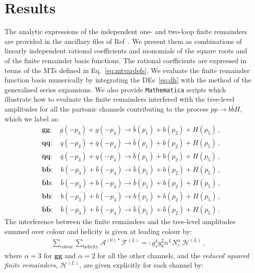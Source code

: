 \documentclass[main.tex]{subfiles}
\begin{document}
\section{Results}
\label{Hbbsec:results}
The analytic expressions of the independent one- and two-loop finite remainders are provided in the ancillary files of Ref~\cite{Badger:2021ega}. We present them as combinations of linearly independent rational coefficients and monomials of the square roots and of the finite remainder basis functions. The rational coefficients are expressed in terms of the MTs defined in Eq.~\ref{eq:mtvardefs}. We evaluate the finite remainder function basis numerically by integrating the DEs~\ref{eq:dh} with the method of the generalised series expansions. We also provide \texttt{Mathematica} scripts which illustrate how to evaluate the finite remainders interfered with the tree-level amplitudes for all the partonic channels contributing to the process $pp\to b\bar{b} H$, which we label as:
\begin{equation}
\label{eq:channel_definition}
\begin{aligned}
&\mathbf{gg}:       \quad  g(-p_3) + g(-p_4) \rightarrow \bar{b}(p_1) + b(p_2) + H(p_5) \,, \\
&\mathbf{q\bar{q}}: \quad  q(-p_3) + \bar{q}(-p_4) \rightarrow \bar{b}(p_1) + b(p_2) + H(p_5) \,, \\
&\mathbf{\bar{q}q}: \quad \bar{q}(-p_3) + q(-p_4) \rightarrow \bar{b}(p_1) + b(p_2) + H(p_5) \,, \\
&\mathbf{b\bar{b}}: \quad b(-p_3) + \bar{b}(-p_4) \rightarrow \bar{b}(p_1) + b(p_2) + H(p_5) \,, \\
&\mathbf{\bar{b}b}: \quad \bar{b}(-p_3) + b(-p_4) \rightarrow \bar{b}(p_1) + b(p_2) + H(p_5) \,, \\
&\mathbf{bb}: \quad b(-p_3) + b(-p_4) \rightarrow b(p_1) + b(p_2) + H(p_5) \,, \\
&\mathbf{\bar{b}\bar{b}}: \quad \bar{b}(-p_3) + \bar{b}(-p_4) \rightarrow \bar{b}(p_1) + \bar{b}(p_2) + H(p_5) \,.
\end{aligned}
\end{equation}
The interference between the finite remainders and the tree-level amplitudes summed over colour and helicity is given at leading colour by: 
\begin{align}
\sum_{\text{colour}} \sum_{\text{helicity}} \mathcal{A}^{(0) *} \mathcal{F}^{(L)} =: g_s^4 y_b^2 n^L N_c^{\alpha} \, \mathcal{H}^{(L)}\,,
\end{align}
where $\alpha=3$ for $\mathbf{gg}$ and $\alpha=2$ for all the other channels, and the \textit{reduced squared finite remainders}, $\mathcal{H}^{(L)}$, are given explicitly for each channel by:
\end{document}
